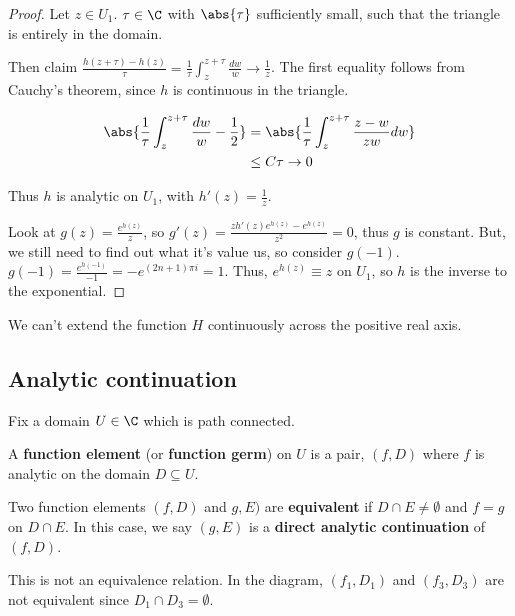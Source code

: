 \documentclass{article}
\begin{document}
\begin{proof}
    Let $z \in U_1$. $\tau \in \C$ with $\abs{\tau}$ sufficiently small, such that the triangle is entirely in the domain.

    Then claim $\frac{h(z + \tau) - h(z)}{\tau} = \frac1{\tau} \int_z^{z+\tau} \frac{dw}{w} \to \frac1z$.
    The first equality follows from Cauchy's theorem, since $h$ is continuous in the triangle.

    \begin{align*}
        \abs{\frac{1}{\tau} \int_z^{z + \tau} \frac{dw}{w} - \frac12} &= \abs{\frac1{\tau} \int_z^{z+\tau} \frac{z-w}{zw} dw} \\
        &\leq C \tau \to 0
    \end{align*}


    Thus $h$ is analytic on $U_1$, with $h'(z) = \frac{1}{z}$.

    Look at $g(z) = \frac{e^{h(z)}}{z}$, so $g'(z) = \frac{z h'(z) e^{h(z)} - e^{h(z)}}{z^2} = 0$, thus $g$ is constant. But, we still need to find out what it's value us, so consider $g(-1)$. $g(-1) = \frac{e^{h(-1)}}{-1} = -e^{(2n+1) \pi i} = 1$.
    Thus, $e^{h(z)} \equiv z$ on $U_1$, so $h$ is the inverse to the exponential.
\end{proof}

\begin{remark}
    We can't extend the function $H$ continuously across the positive real axis.
\end{remark}

\subsection{Analytic continuation}
Fix a domain $U \in \C$ which is path connected.

\begin{defi}
    A \textbf{function element} (or \textbf{function germ}) on $U$ is a pair, $(f, D)$ where $f$ is analytic on the domain $D \subseteq U$.

    Two function elements $(f, D)$ and $g, E)$ are \textbf{equivalent} if $D \cap E \neq \emptyset$ and $f = g$ on $D \cap E$. In this case, we say $(g, E)$ is a \textbf{direct analytic continuation} of $(f, D)$.
\end{defi}

\begin{remark}
    This is not an equivalence relation.  In the diagram, $(f_1, D_1)$ and $(f_3, D_3)$ are not equivalent since $D_1 \cap D_3 = \emptyset$.
\end{remark}
\end{document}
